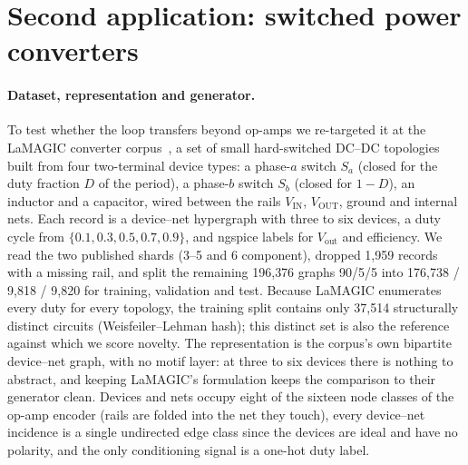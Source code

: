 \section{Second application: switched power converters}
\label{sec:converters}

\paragraph{Dataset, representation and generator.}
To test whether the loop transfers beyond op-amps we re-targeted it at the
LaMAGIC converter corpus~\cite{lamagic}, a set of small hard-switched
DC--DC topologies built from four two-terminal device types: a phase-$a$
switch $S_a$ (closed for the duty fraction $D$ of the period), a phase-$b$
switch $S_b$ (closed for $1-D$), an inductor and a capacitor, wired between
the rails $V_\mathrm{IN}$, $V_\mathrm{OUT}$, ground and internal nets.
Each record is a device--net hypergraph with three to six devices, a duty
cycle from $\{0.1,0.3,0.5,0.7,0.9\}$, and ngspice labels for $V_\mathrm{out}$
and efficiency. We read the two published shards (3--5 and 6 component),
dropped 1{,}959 records with a missing rail, and split the remaining 196{,}376
graphs 90/5/5 into 176{,}738 / 9{,}818 / 9{,}820 for training, validation and
test. Because LaMAGIC enumerates every duty for every topology, the training
split contains only 37{,}514 structurally distinct circuits (Weisfeiler--Lehman
hash); this distinct set is also the reference against which we score
novelty. The representation is the corpus's own bipartite device--net graph,
with no motif layer: at three to six devices there is nothing to abstract, and
keeping LaMAGIC's formulation keeps the comparison to their generator clean.
Devices and nets occupy eight of the sixteen node classes of the op-amp
encoder (rails are folded into the net they touch), every device--net
incidence is a single undirected edge class since the devices are ideal and
have no polarity, and the only conditioning signal is a one-hot duty label.
